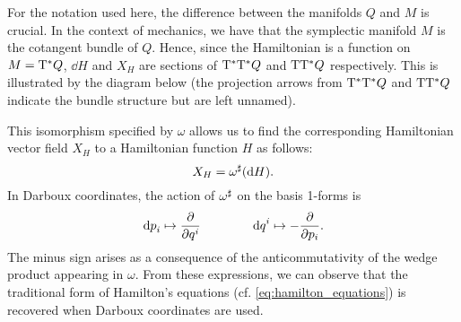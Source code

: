 For the notation used here, the difference between the manifolds \(Q\) and \(M\) is crucial. In the context of mechanics, we have that the symplectic manifold \(M\) is the cotangent bundle of \(Q\). Hence, since the Hamiltonian is a function on \(M = \mathrm{T}^*Q\), \(\dd{H}\) and \(X_H\) are sections of \(\mathrm{T}^*\mathrm{T}^*Q\) and \(\mathrm{T}\mathrm{T}^*Q\) respectively. This is illustrated by the diagram below (the projection arrows from \(\mathrm{T}^*\mathrm{T}^*Q\) and \(\mathrm{T}\mathrm{T}^*Q\) indicate the bundle structure but are left unnamed).
\begin{center}
\end{center}
This isomorphism specified by \(\omega\) allows us to find the corresponding Hamiltonian vector field \(X_H\) to a Hamiltonian function \(H\) as follows:
\begin{equation} 
    X_H = \omega^\sharp(\dd{H}). 
    \label{eq:symplectic_hamiltonian_vf}
\end{equation}
In Darboux coordinates, the action of \( \omega^\sharp\) on the basis 1-forms is
\begin{equation}
     \dd{p}_i \mapsto \pdv{}{q^i} \qquad\qquad \dd{q}^i \mapsto -\pdv{}{p_i}.
\end{equation} 
The minus sign arises as a consequence of the anticommutativity of the wedge product appearing in \(\omega\). From these expressions, we can observe that the traditional form of Hamilton's equations (cf. \cref{eq:hamilton_equations}) is recovered when Darboux coordinates are used.

